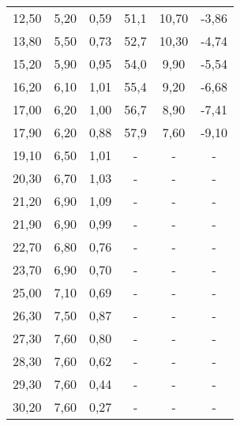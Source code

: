 \begin{table}[htp]
\begin{center}
\begin{tabular}{cccccc}
			12,50 & 5,20 & 0,59 & 51,1 	& 10,70 & -3,86\\
			13,80 & 5,50 & 0,73 & 52,7 	& 10,30 & -4,74\\
			15,20 & 5,90 & 0,95 & 54,0 	& 9,90 & -5,54\\
			16,20 & 6,10 & 1,01 & 55,4 	& 9,20 & -6,68\\
			17,00 & 6,20 & 1,00 & 56,7 	& 8,90 & -7,41\\
			17,90 & 6,20 & 0,88 & 57,9 	& 7,60 & -9,10\\
			19,10 & 6,50 & 1,01 & - & - & -\\
			20,30 & 6,70 & 1,03 & - & - & -\\
			21,20 & 6,90 & 1,09 & - & - & -\\
			21,90 & 6,90 & 0,99 & - & - & -\\
			22,70 & 6,80 & 0,76 & - & - & -\\
			23,70 & 6,90 & 0,70 & - & - & -\\
			25,00 & 7,10 & 0,69 & - & - & -\\
			26,30 & 7,50 & 0,87 & - & - & -\\
			27,30 & 7,60 & 0,80 & - & - & -\\
			28,30 & 7,60 & 0,62 & - & - & -\\
			29,30 & 7,60 & 0,44 & - & - & -\\
			30,20 & 7,60 & 0,27 & - & - & -\\
      \bottomrule
      \end{tabular}
    \end{center}
  \end{table}


